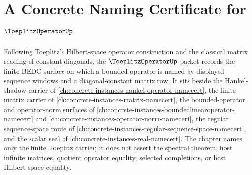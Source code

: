 \chapter{A Concrete Naming Certificate for $\ToeplitzOperatorUp$}
\label{ch:concrete-instances-toeplitz-operator-namecert}

Following Toeplitz's Hilbert-space operator construction and the classical matrix reading of constant diagonals, the $\ToeplitzOperatorUp$ packet records the finite BEDC surface on which a bounded operator is named by displayed sequence windows and a diagonal-constant matrix row. It sits beside the Hankel-shadow carrier of \autoref{ch:concrete-instances-hankel-operator-namecert}, the finite matrix carrier of \autoref{ch:concrete-instances-matrix-namecert}, the bounded-operator and operator-norm surfaces of \autoref{ch:concrete-instances-boundedlinearoperator-namecert} and \autoref{ch:concrete-instances-operator-norm-namecert}, the regular sequence-space route of \autoref{ch:concrete-instances-regular-sequence-space-namecert}, and the scalar seal of \autoref{ch:concrete-instances-real-namecert}. The chapter names only the finite Toeplitz carrier; it does not assert the spectral theorem, host infinite matrices, quotient operator equality, selected completions, or host Hilbert-space equality.

